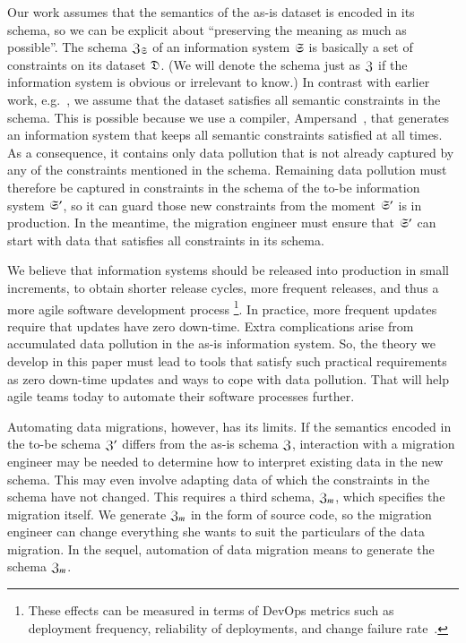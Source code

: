 \documentclass{elsarticle}
\begin{document}
   Our work assumes that the semantics of the as-is dataset is encoded in its schema,
   so we can be explicit about ``preserving the meaning as much as possible''.
   The schema $\mathfrak{Z}_{\mathfrak{S}}$ of an information system $\mathfrak{S}$ is basically a set of constraints on its dataset $\mathfrak{D}$.
   (We will denote the schema just as $\mathfrak{Z}$ if the information system is obvious or irrelevant to know.)
   In contrast with earlier work, e.g.~\cite{Thalheim2013}, we assume that the dataset satisfies all semantic constraints in the schema.
   This is possible because we use a compiler, Ampersand~\cite{Joosten-JLAMP2018},
   that generates an information system that keeps all semantic constraints satisfied at all times.
   As a consequence, it contains only data pollution that is not already captured by any of the constraints mentioned in the schema.
   Remaining data pollution must therefore be captured in constraints in the schema of the to-be information system $\mathfrak{S}'$,
   so it can guard those new constraints from the moment $\mathfrak{S}'$ is in production.
   In the meantime, the migration engineer must ensure that $\mathfrak{S}'$ can start with data that satisfies all constraints in its schema.

   We believe that information systems should be released into production in small increments,
   to obtain shorter release cycles, more frequent releases, and thus a more agile software development process%
   \footnote{These effects can be measured in terms of DevOps metrics such as
   deployment frequency,
   reliability of deployments, and
   change failure rate~\cite{DevOps2021}.}.
   In practice, more frequent updates require that updates have zero down-time.
   Extra complications arise from accumulated data pollution in the as-is information system.
   So, the theory we develop in this paper must lead to tools that satisfy such practical requirements as
   zero down-time updates and ways to cope with data pollution.
   That will help agile teams today to automate their software processes further.

   Automating data migrations, however, has its limits.
   If the semantics encoded in the to-be schema $\mathfrak{Z}'$ differs from the as-is schema $\mathfrak{Z}$,
   interaction with a migration engineer may be needed to determine how to interpret existing data in the new schema.
   This may even involve adapting data of which the constraints in the schema have not changed.
   This requires a third schema, $\mathfrak{Z}_m$, which specifies the migration itself.
   We generate $\mathfrak{Z}_m$ in the form of source code, so the migration engineer can change everything she wants to suit the particulars of the data migration.
   In the sequel, automation of data migration means to generate the schema $\mathfrak{Z}_m$.
\end{document}
